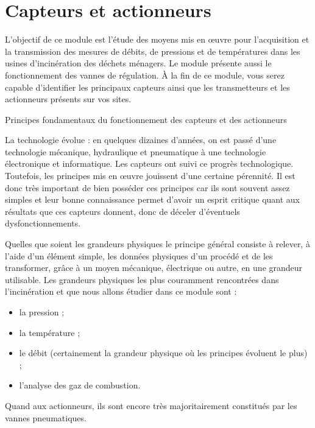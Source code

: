 \chapter{Capteurs et actionneurs}

L’objectif de ce module est l’étude des moyens mis en œuvre pour l’acquisition et la transmission des mesures de débits, de pressions et de températures dans les usines d’incinération des déchets ménagers. Le module présente aussi le fonctionnement des vannes de régulation.
À la fin de ce module, vous serez capable d’identifier les principaux capteurs ainsi que les transmetteurs et les actionneurs présents sur vos sites.

\vspace{0.3cm}
Principes fondamentaux du fonctionnement  des capteurs et des actionneurs
\vspace{0.3cm} 

La technologie évolue : en quelques dizaines d’années, on est passé d’une technologie mécanique, hydraulique et pneumatique à une technologie électronique et informatique. Les capteurs ont suivi ce progrès technologique. Toutefois, les principes mis en œuvre jouissent d’une certaine pérennité. Il est donc très important de bien posséder ces principes car ils sont souvent assez simples et leur bonne connaissance permet d’avoir un esprit critique quant aux résultats que ces capteurs donnent, donc de déceler d’éventuels dysfonctionnements. 
\vspace{0.3cm}

Quelles que soient les grandeurs physiques le principe général consiste à relever, à l’aide d’un élément simple, les données physiques d’un procédé et de les transformer, grâce à un moyen mécanique, électrique ou autre, en une grandeur utilisable. 
Les grandeurs physiques les plus couramment rencontrées dans l’incinération et que nous allons étudier dans ce module sont :


\begin{itemize} 
\item  la pression ;
\item  la température ;
\item  le débit (certainement la grandeur physique où les principes évoluent le plus) ;
\item  l’analyse des gaz de combustion.

\end{itemize}
Quand aux actionneurs, ils sont encore très majoritairement constitués par les vannes pneumatiques.


